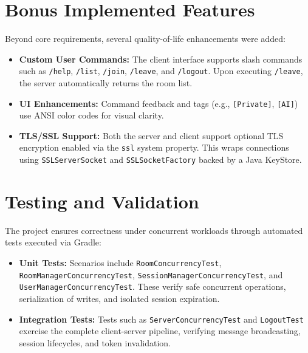 \documentclass[12pt,a4paper]{article}
\begin{document}
\section{Bonus Implemented Features}
\label{sec:bonus}

Beyond core requirements, several quality-of-life enhancements were added:
\begin{itemize}
    \item \textbf{Custom User Commands:} The client interface supports slash commands such as \texttt{/help}, \texttt{/list}, \texttt{/join}, \texttt{/leave}, and \texttt{/logout}. Upon executing \texttt{/leave}, the server automatically returns the room list.
    \item \textbf{UI Enhancements:} Command feedback and tags (e.g., \texttt{[Private]}, \texttt{[AI]}) use ANSI color codes for visual clarity.
    \item \textbf{TLS/SSL Support:} Both the server and client support optional TLS encryption enabled via the \texttt{ssl} system property. This wraps connections using \texttt{SSLServerSocket} and \texttt{SSLSocketFactory} backed by a Java KeyStore.
\end{itemize}

\section{Testing and Validation}
\label{sec:testing}

The project ensures correctness under concurrent workloads through automated tests executed via Gradle:
\begin{itemize}
    \item \textbf{Unit Tests:} Scenarios include \texttt{RoomConcurrencyTest}, \texttt{RoomManagerConcurrencyTest}, \texttt{SessionManagerConcurrencyTest}, and \texttt{UserManagerConcurrencyTest}. These verify safe concurrent operations, serialization of writes, and isolated session expiration.
    \item \textbf{Integration Tests:} Tests such as \texttt{ServerConcurrencyTest} and \texttt{LogoutTest} exercise the complete client-server pipeline, verifying message broadcasting, session lifecycles, and token invalidation.
\end{itemize}
\end{document}
